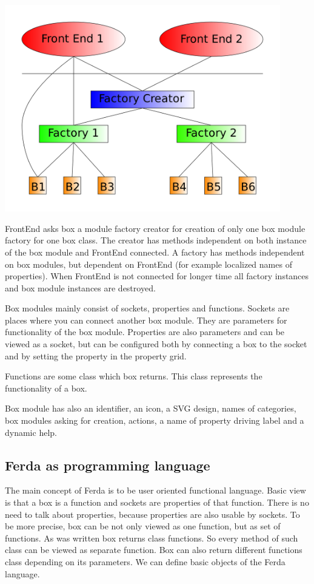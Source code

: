 \documentclass[a4paper,12pt]{book}
\begin{document}
\noindent\includegraphics[width=12cm]{creatorFactory}

FrontEnd asks box a module factory creator for creation of only one box module factory for one box class. The creator has methods independent on both instance of the box module and FrontEnd connected. A factory has methods independent on box modules, but dependent on FrontEnd (for example localized names of properties). When FrontEnd is not connected for longer time all factory instances and box module instances are destroyed.

Box modules mainly consist of sockets, properties and functions. Sockets are places where you can connect another box module. They are parameters for functionality of the box module. Properties are also parameters and can be viewed as a socket, but can be configured both by connecting a box to the socket and by setting the property in the property grid.

Functions are some class which box returns. This class represents the functionality of a box.

Box module has also an identifier, an icon, a SVG design, names of categories, box modules asking for creation, actions, a name of property driving label and a dynamic help.

\subsection{Ferda as programming language}
The main concept of Ferda is to be user oriented functional language. Basic view is that a box is a function and sockets are properties of that function. There is no need to talk about properties, because properties are also usable by sockets. To be more precise, box can be not only viewed as one function, but as set of functions. As was written box returns class functions. So every method of such class can be viewed as separate function. Box can also return different functions class depending on its parameters. We can define basic objects of the Ferda language.
\end{document}
